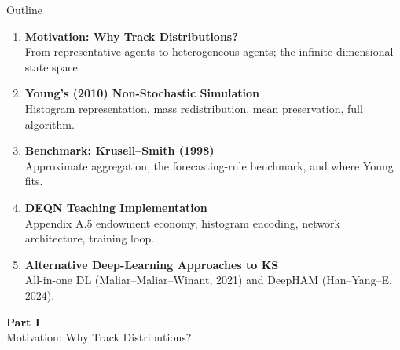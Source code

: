 \documentclass[aspectratio=169,11pt]{beamer}
\begin{document}
\begin{frame}{Outline}
\begin{enumerate}
    \item \textbf{Motivation: Why Track Distributions?}\\
    {\small From representative agents to heterogeneous agents; the infinite-dimensional state space.}

    \vspace{0.3em}
    \item \textbf{Young's (2010) Non-Stochastic Simulation}\\
    {\small Histogram representation, mass redistribution, mean preservation, full algorithm.}

    \vspace{0.3em}
    \item \textbf{Benchmark: Krusell--Smith (1998)}\\
    {\small Approximate aggregation, the forecasting-rule benchmark, and where Young fits.}

    \vspace{0.3em}
    \item \textbf{DEQN Teaching Implementation}\\
    {\small Appendix A.5 endowment economy, histogram encoding, network architecture, training loop.}

    \vspace{0.3em}
    \item \textbf{Alternative Deep-Learning Approaches to KS}\\
    {\small All-in-one DL (Maliar--Maliar--Winant, 2021) and DeepHAM (Han--Yang--E, 2024).}
\end{enumerate}
\end{frame}


\begin{frame}{}
\vfill
\begin{center}
{\Huge \textcolor{uzhblue}{\textbf{Part I}}}\\[12pt]
{\LARGE Motivation: Why Track Distributions?}
\end{center}
\vfill
\end{frame}
\end{document}
